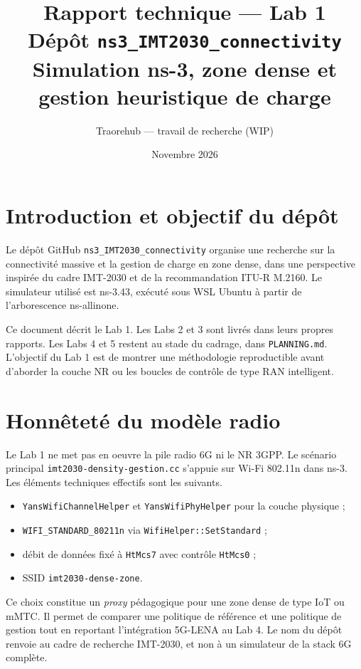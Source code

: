 \documentclass[11pt,a4paper]{article}
\title{Rapport technique --- Lab 1\\
\large Dépôt \texttt{ns3\_IMT2030\_connectivity}\\
Simulation ns-3, zone dense et gestion heuristique de charge}
\author{Traorehub --- travail de recherche (WIP)}
\date{Novembre 2026}
\begin{document}
\maketitle
\tableofcontents
\newpage

\section{Introduction et objectif du dépôt}

Le dépôt GitHub \texttt{ns3\_IMT2030\_connectivity} organise une recherche sur la connectivité massive et la gestion de charge en zone dense, dans une perspective inspirée du cadre IMT-2030 et de la recommandation ITU-R M.2160. Le simulateur utilisé est ns-3.43, exécuté sous WSL Ubuntu à partir de l'arborescence ns-allinone.

Ce document décrit le Lab 1. Les Labs 2 et 3 sont livrés dans leurs propres rapports. Les Labs 4 et 5 restent au stade du cadrage, dans \texttt{PLANNING.md}. L'objectif du Lab 1 est de montrer une méthodologie reproductible avant d'aborder la couche NR ou les boucles de contrôle de type RAN intelligent.

\section{Honnêteté du modèle radio}

Le Lab 1 ne met pas en oeuvre la pile radio 6G ni le NR 3GPP. Le scénario principal \texttt{imt2030-density-gestion.cc} s'appuie sur Wi-Fi 802.11n dans ns-3. Les éléments techniques effectifs sont les suivants.
\begin{itemize}
  \item \texttt{YansWifiChannelHelper} et \texttt{YansWifiPhyHelper} pour la couche physique ;
  \item \texttt{WIFI\_STANDARD\_80211n} via \texttt{WifiHelper::SetStandard} ;
  \item débit de données fixé à \texttt{HtMcs7} avec contrôle \texttt{HtMcs0} ;
  \item SSID \texttt{imt2030-dense-zone}.
\end{itemize}

Ce choix constitue un \emph{proxy} pédagogique pour une zone dense de type IoT ou mMTC. Il permet de comparer une politique de référence et une politique de gestion tout en reportant l'intégration 5G-LENA au Lab 4. Le nom du dépôt renvoie au cadre de recherche IMT-2030, et non à un simulateur de la stack 6G complète.
\end{document}
